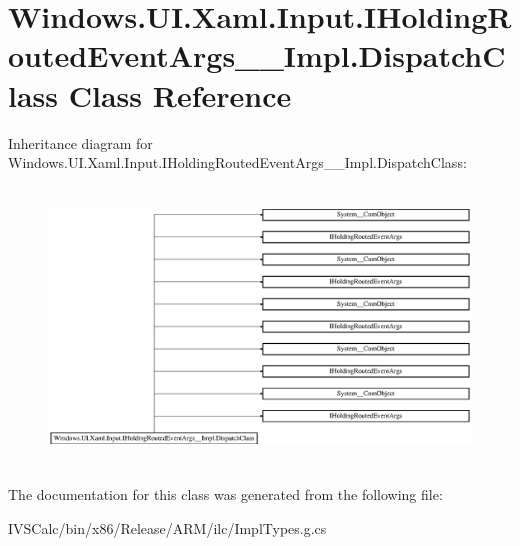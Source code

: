 \hypertarget{class_windows_1_1_u_i_1_1_xaml_1_1_input_1_1_i_holding_routed_event_args_____impl_1_1_dispatch_class}{}\section{Windows.\+U\+I.\+Xaml.\+Input.\+I\+Holding\+Routed\+Event\+Args\+\_\+\+\_\+\+Impl.\+Dispatch\+Class Class Reference}
\label{class_windows_1_1_u_i_1_1_xaml_1_1_input_1_1_i_holding_routed_event_args_____impl_1_1_dispatch_class}
Inheritance diagram for Windows.\+U\+I.\+Xaml.\+Input.\+I\+Holding\+Routed\+Event\+Args\+\_\+\+\_\+\+Impl.\+Dispatch\+Class\+:\begin{figure}[H]
\begin{center}
\leavevmode
\includegraphics[height=7.403846cm]{class_windows_1_1_u_i_1_1_xaml_1_1_input_1_1_i_holding_routed_event_args_____impl_1_1_dispatch_class}
\end{center}
\end{figure}


The documentation for this class was generated from the following file\+:\begin{DoxyCompactItemize}
\item 
I\+V\+S\+Calc/bin/x86/\+Release/\+A\+R\+M/ilc/Impl\+Types.\+g.\+cs\end{DoxyCompactItemize}
